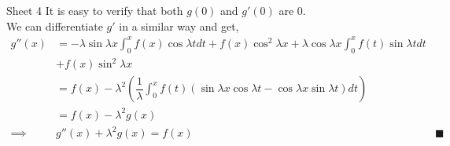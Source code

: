 \documentclass[handout, aspectratio=169]{beamer}
\begin{document}
\begin{frame}{Sheet 4}
	It is easy to verify that both $g(0)$ and $g'(0)$ are 0.\\
	We can differentiate $g'$ in a similar way and get,
	\begin{align*}
		g''(x) &= -\lambda\sin\lambda x\int_{0}^{x} f(x)\cos \lambda t dt + f(x)\cos^2\lambda x + \lambda \cos \lambda x \int_{0}^{x} f(t)\sin \lambda t dt \\
		& + f(x)\sin^2 \lambda x\\
		&= f(x) - \lambda^2\left(\dfrac{1}{\lambda}\int_{0}^{x} f(t) \left(\sin \lambda x\cos \lambda t - \cos \lambda x \sin \lambda t\right) dt\right)\\
		&= f(x) - \lambda^2g(x)\\
		\implies & g''(x) + \lambda^2g(x) = f(x) & \blacksquare
	\end{align*}
\end{frame}
\end{document}
